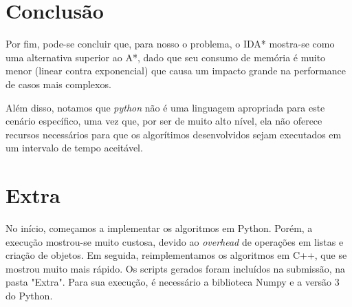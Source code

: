 \documentclass[12pt,a4paper]{article}
\begin{document}
\newpage

\section{Conclusão}
    \par Por fim, pode-se concluir que, para nosso o problema, o IDA* mostra-se como uma alternativa superior ao A*, dado que seu consumo de memória é muito menor (linear contra exponencial) que causa um impacto grande na performance de casos mais complexos.
    \par Além disso, notamos que \textit{python} não é uma linguagem apropriada para este cenário específico, uma vez que, por ser de muito alto nível, ela não oferece recursos necessários para que os algorítimos desenvolvidos sejam executados em um intervalo de tempo aceitável.
\newpage

\section{Extra}
No início, começamos a implementar os algoritmos em Python. Porém, a execução mostrou-se muito custosa, devido ao \textit{overhead} de operações em listas e criação de objetos. Em seguida, reimplementamos os algoritmos em C++, que se mostrou muito mais rápido. Os scripts gerados foram incluídos na submissão, na pasta "Extra". Para sua execução, é necessário a biblioteca Numpy e a versão 3 do Python.
\newpage
\end{document}
